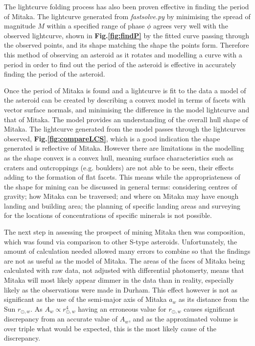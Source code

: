\documentclass[10pt,twocolumn]{revtex4}    %
\newcommand*{\astrosun}{{\odot}}
\newcommand{\reffig}[1]{\textbf{Fig.#1}}
\newcommand{\rsm}{r_{\astrosun,w}}
\begin{document}
The lightcurve folding process has also been proven effective in finding the period of Mitaka. The lightcurve generated from \textit{fastsolve.py} by minimising the spread of magnitude $M$ within a specified range of phase $\phi$ agrees very well with the observed lightcurve, shown in \reffig{\ref{fig:findP}} by the fitted curve passing through the observed points, and its shape matching the shape the points form. Therefore this method of observing an asteroid as it rotates and modelling a curve with a period in order to find out the period of the asteroid is effective in accurately finding the period of the asteroid.

Once the period of Mitaka is found and a lightcurve is fit to the data a model of the asteroid can be created by describing a convex model in terms of facets with vector surface normals, and minimising the difference in the model lightcurve and that of Mitaka. The model provides an understanding of the overall hull shape of Mitaka. The lightcurve generated from the model passes through the lightcurves observed, \reffig{\ref{fig:compareLCS}}, which is a good indication the shape generated is reflective of Mitaka. 
However there are limitations in the modelling as the shape convex is a convex hull, meaning surface characteristics such as craters and outcroppings (e.g. boulders) are not able to be seen, their effects adding to the formation of flat facets. This means while the appropriateness of the shape for mining can be discussed in general terms: considering centres of gravity; how Mitaka can be traversed; and where on Mitaka may have enough landing and building area; the planning of specific landing areas and surveying for the locations of concentrations of specific minerals is not possible. 

The next step in assessing the prospect of mining Mitaka then was composition, which was found via comparison to other S-type asteroids. Unfortunately, the amount of calculation needed allowed many errors to combine so that the findings are not as useful as the model of Mitaka.
The areas of the faces of Mitaka being calculated with  raw data, not adjusted with differential photomerty, means that Mitaka will most likely appear dimmer in the data than in reality, especially likely as the observations were made in Durham. This effect however is not as significant as the use of the semi-major axis of Mitaka $a_w$ as its distance from the Sun $\rsm$. As $A_w \propto \rsm^4$ having an erroneous value for $\rsm$ causes significant discrepancy from an accurate value of $A_w$, and as the approximated volume is over triple what would be expected, this is the most likely cause of the discrepancy.
\end{document}

